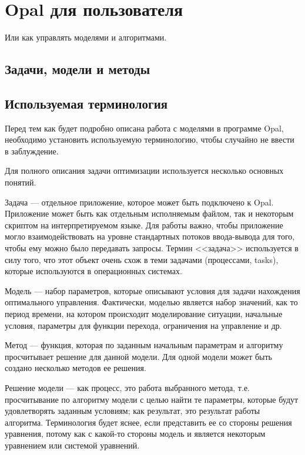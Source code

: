 \chapter{Opal для пользователя}

Или как управлять моделями и алгоритмами.

\section{Задачи, модели и методы}

\section{Используемая терминология}

Перед тем как будет подробно описана работа с моделями в программе Opal, необходимо установить используемую терминологию, чтобы случайно не ввести в заблуждение.

Для полного описания задачи оптимизации используется несколько основных понятий.

Задача — отдельное приложение, которое может быть подключено к Opal. Приложение может быть как отдельным исполняемым файлом, так и некоторым скриптом на интерпретируемом языке. Для работы важно, чтобы приложение могло взаимодействовать на уровне стандартных потоков ввода-вывода для того, чтобы ему можно было передавать запросы. Термин <<задача>> используется в силу того, что этот объект очень схож в теми задачами (процессами, tasks), которые используются в операционных системах.

Модель — набор параметров, которые описывают условия для задачи нахождения оптимального управления. Фактически, моделью является набор значений, как то период времени, на котором происходит моделирование ситуации, начальные условия, параметры для функции перехода, ограничения на управление и др.

Метод — функция, которая по заданным начальным параметрам и алгоритму просчитывает решение для данной модели. Для одной модели может быть создано несколько методов ее решения.

Решение модели — как процесс, это работа выбранного метода, т.е. просчитывание по алгоритму модели с целью найти те параметры, которые будут удовлетворять заданным условиям; как результат, это результат работы алгоритма. Терминология будет яснее, если представить ее со стороны решения уравнения, потому как с какой-то стороны модель и является некоторым уравнением или системой уравнений.


